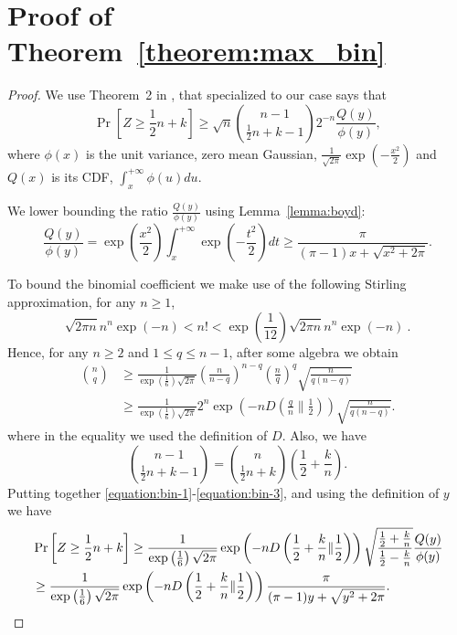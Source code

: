 \documentclass{article}
\begin{document}



\appendix

\section{Proof of Theorem~\ref{theorem:max_bin}}

\begin{proof}
We use Theorem~2 in \cite{McKay1989}, that specialized to our case says that
\begin{equation}
\label{equation:bin-1}
\Pr \left[ Z \ge  \frac{1}{2} n + k  \right]
\ge \sqrt{n} \binom{n-1}{ \frac{1}{2} n + k -1} 2^{-n} \frac{Q(y)}{\phi(y)},
\end{equation}
where $\phi(x)$ is the unit variance, zero mean Gaussian, $\frac{1}{\sqrt{2 \pi}} \exp(-\frac{x^2}{2})$ and $Q(x)$ is its CDF, $\int_{x}^{+\infty} \phi(u) du$.

We lower bounding the ratio $\frac{Q(y)}{\phi(y)}$ using Lemma~\ref{lemma:boyd}:
\[
\frac{Q(y)}{\phi(y)}
= \exp\left(\frac{x^2}{2}\right) \int_{x}^{+\infty} \exp\left(-\frac{t^2}{2}\right) dt
\ge \frac{\pi}{(\pi-1)x+\sqrt{x^2+2 \pi}}.
\]

To bound the binomial coefficient we make use of the following Stirling approximation, for any $n\ge 1$,
\[
\sqrt{2 \pi n} n^n \exp(-n) < n! < \exp\left(\frac{1}{12}\right)\sqrt{2 \pi n} n^n \exp(-n)~.
\]
Hence, for any $n \ge 2$ and $1\le q \le n-1$, after some algebra we obtain
\begin{align*}
{n \choose q}
& \ge \frac{1}{\exp\left(\frac{1}{6}\right) \sqrt{2 \pi}} \left(\frac{n}{n-q}\right)^{n-q} \left(\frac{n}{q}\right)^{q} \sqrt{\frac{n}{q(n-q)}} \\
& \ge \frac{1}{\exp\left(\frac{1}{6}\right) \sqrt{2 \pi}} 2^n \exp\left(-n D\left(\frac{q}{n} \| \frac{1}{2}\right)\right) \sqrt{\frac{n}{q(n-q)}}.
\end{align*}
where in the equality we used the definition of $D$.
Also, we have
\begin{equation}
\label{equation:bin-3}
{n-1 \choose \frac{1}{2} n + k - 1} = {n \choose \frac{1}{2} n + k} \left(\frac{1}{2} + \frac{k}{n}\right) .
\end{equation}
Putting together \eqref{equation:bin-1}-\eqref{equation:bin-3}, and using the definition of $y$ we have
\begin{align*}
&\Pr\left[ Z \ge \frac{1}{2} n + k \right]
\ge \frac{1}{\exp\left(\frac{1}{6}\right) \sqrt{2 \pi}} \exp\left(-n D\left(\frac{1}{2}+\frac{k}{n} \| \frac{1}{2}\right)\right) \sqrt{\frac{\frac{1}{2} + \frac{k}{n}}{\frac{1}{2}-\frac{k}{n}}}  \frac{Q(y)}{\phi(y)} \\
&\ge \frac{1}{\exp\left(\frac{1}{6}\right) \sqrt{2 \pi}} \exp\left(-n D\left(\frac{1}{2}+\frac{k}{n} \| \frac{1}{2}\right)\right) \frac{\pi}{(\pi-1)y+\sqrt{y^2+2 \pi}}. \qedhere
\end{align*}
\end{proof}
\end{document}
